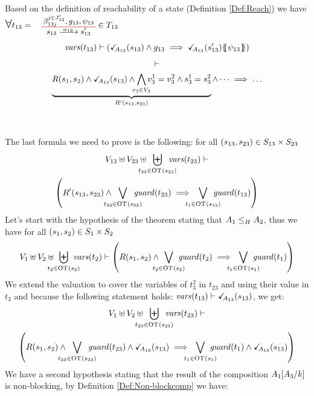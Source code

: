 \documentclass[runningheads]{llncs}
\begin{document}
\begin{enumerate}
Based on the definition of reachability of a state (Definition \ref{Def:Reach}) we have $\bigsymb{\forall} t_{13} = \OTx{13}{}{13}{13} \in T_{13}$
\[\fvars{t_{13}} \vdash \left(\reach{A_{13}}\mpar{s_{13}} \wedge g_{13} \implies \reach{A_{13}}\mpar{s_{13}'}\psubst{\psi_{13}}\right)\]
\begin{multline*}
\vdash\\ \underbrace{R\mpar{s_1, s_2} \wedge \reach{A_{13}}\mpar{s_{13}} \wedge \bigwedge_\subbox{v_3\in V_3}  v^1_3=v^2_3\wedge s^1_3=s^2_3}_{R^{\prime}(s_{13},s_{23})}  \wedge \dots \implies \ldots 
\end{multline*}
~~\\
~~\\
The last formula we need to prove is the following: for all $\mpar{s_{13}, s_{23}} \in S_{13} \times S_{23}$
\begin{multline*}
V_{13} \uplus V_{23} \uplus \biguplus_\subbox{t_{23}\in \fOT{s_{23}}} \fvars{t_{23}} \vdash \\ \left(R^{\prime}\mpar{s_{13}, s_{23}} \wedge \bigvee_\subbox{t_{23} \in \fOT{s_{23}}} \fguard{t_{23}} \implies \bigvee_\subbox{t_1 \in \fOT{s_{13}}} \fguard{t_{13}} \right)
\end{multline*}
Let's start  with the hypothesis of the theorem stating that $\wrel{A_1}{A_2}{H}$, thus we have for all  $\mpar{s_1, s_2} \in S_1 \times S_2$ 
\begin{multline*}
V_1 \uplus V_2 \uplus \biguplus_\subbox{t_2 \in \fOT{s_2}} \fvars{t_2} \vdash \left(R\mpar{s_1, s_2} \wedge \bigvee_\subbox{t_2 \in \fOT{s_2}} \fguard{t_2} \implies \bigvee_\subbox{t_1 \in \fOT{s_1}} \fguard{t_1} \right)
\end{multline*}
We extend the valuation to cover the variables of  $t^2_3$ in $t_{23}$ and using their value in $t_3$ and because the following statement holds: $\fvars{t_{13}} \vdash \reach{A_{13}}\mpar{s_{13}}$, we get:
\begin{multline*}
V_1 \uplus V_2 \uplus \biguplus_\subbox{t_{23} \in \fOT{s_{23}}} \fvars{t_{23}} \vdash\\ \left(R\mpar{s_1, s_2} \wedge \bigvee_\subbox{t_{23} \in \fOT{s_{23}}} \fguard{t_{23}}  \wedge \reach{A_{13}}\mpar{s_{13}} \implies \bigvee_\subbox{t_1 \in \fOT{s_1}} \fguard{t_1}   \wedge \reach{A_{13}}\mpar{s_{13}}\right)
\end{multline*}
We have a second hypothesis stating that the result of the composition \(A_1\subst{A_3}{k}\) is non-blocking, by Definition \ref{Def:Non-blockcomp} we have:
\begin{multline*}

\end{multline*}
\end{enumerate}
\end{document}
